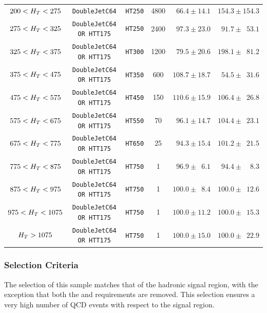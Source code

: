 \begin{table}[!ht]
\begin{tabular}{ ccccll }
    \hline
    $200 < H_T < 275$  & \verb!DoubleJetC64!           & \verb!HT250! & 4800     & $\phantom{1}66.4 \pm 14.1$                & $154.3 \pm 154.3$                     \\
    $275 < H_T < 325$  & \verb!DoubleJetC64 OR HTT175! & \verb!HT250! & 2400     & $\phantom{1}97.3 \pm 23.0$                & $\phantom{1}91.7 \pm \phantom{1}53.1$ \\
    $325 < H_T < 375$  & \verb!DoubleJetC64 OR HTT175! & \verb!HT300! & 1200     & $\phantom{1}79.5 \pm 20.6$                & $198.1 \pm \phantom{1}81.2$           \\
    $375 < H_T < 475$  & \verb!DoubleJetC64 OR HTT175! & \verb!HT350! & 600      & $108.7 \pm 18.7$                          & $\phantom{1}54.5 \pm \phantom{1}31.6$ \\
    $475 < H_T < 575$  & \verb!DoubleJetC64 OR HTT175! & \verb!HT450! & 150      & $110.6 \pm 15.9$                          & $106.4 \pm \phantom{1}26.8$           \\
    $575 < H_T < 675$  & \verb!DoubleJetC64 OR HTT175! & \verb!HT550! & 70       & $\phantom{1}96.1 \pm 14.7$                & $104.4 \pm \phantom{1}23.1$           \\
    $675 < H_T < 775$  & \verb!DoubleJetC64 OR HTT175! & \verb!HT650! & 25       & $\phantom{1}94.3 \pm 15.4$                & $101.2 \pm \phantom{1}21.5$           \\
    $775 < H_T < 875$  & \verb!DoubleJetC64 OR HTT175! & \verb!HT750! & 1        & $\phantom{1}96.9 \pm \phantom{1}6.1$      & $\phantom{1}94.4 \pm \phantom{11}8.3$ \\
    $875 < H_T < 975$  & \verb!DoubleJetC64 OR HTT175! & \verb!HT750! & 1        & $100.0 \pm \phantom{1}8.4$                & $100.0 \pm \phantom{1}12.6$           \\
    $975 < H_T < 1075$ & \verb!DoubleJetC64 OR HTT175! & \verb!HT750! & 1        & $100.0 \pm 11.2$                          & $100.0 \pm \phantom{1}15.3$           \\
    $H_T > 1075$       & \verb!DoubleJetC64 OR HTT175! & \verb!HT750! & 1        & $100.0 \pm 15.0$                          & $100.0 \pm \phantom{1}22.9$           \\
    \hline
    \hline
  \end{tabular}
\end{table}

\subsubsection{Selection Criteria}
The selection of this sample matches that of the hadronic signal region, with 
the exception that both the \alphat and \mhtmet requirements are removed. This 
selection ensures a very high number of QCD events with respect to the signal 
region.


